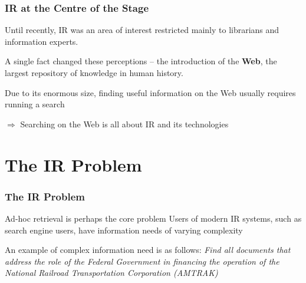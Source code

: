 \documentclass[svgnames]{beamer}
\begin{document}
\begin{frame}
  \frametitle{IR at the Centre of the Stage}

\begin{block}{}
Until recently, IR was an area of interest restricted mainly to
librarians and information experts. 
\end{block}

\begin{block}{}
A single fact changed these perceptions -- the introduction of the
\textbf{Web}, the largest repository of knowledge in human history. 

Due to its enormous size, finding useful information on the Web
usually requires \alert{running a search} 
\end{block}


\begin{block}{$\Rightarrow$ Searching on the Web is all about IR and its technologies}
\end{block}



\end{frame}



\section{The IR Problem}


\begin{frame}
\frametitle{The IR Problem}
Ad-hoc retrieval is perhaps the core problem
\vfill
Users of modern IR systems, such as search engine users, have information needs of varying complexity

\begin{block}{An example of complex information need is as follows:}
{\it Find all documents that address the role
of the Federal Government in financing
the operation of the National Railroad
Transportation Corporation (AMTRAK)}
\end{block}

\end{frame}
\end{document}
